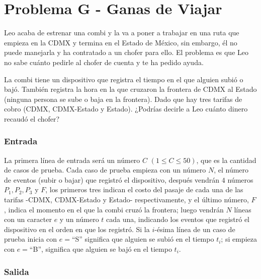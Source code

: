 \chapter*{Problema G - Ganas de Viajar}


Leo acaba de estrenar una combi y la va a poner a trabajar en una ruta que empieza en la CDMX y termina en el Estado de México, sin embargo, él no puede manejarla y ha contratado a un chofer para ello. El problema es que Leo no sabe cuánto pedirle al chofer de cuenta y te ha pedido ayuda.

La combi tiene un dispositivo que registra el tiempo en el que alguien subió o bajó. También registra la hora en la que cruzaron la frontera de CDMX al Estado (ninguna persona se sube o baja en la frontera). Dado que hay tres tarifas de cobro (CDMX, CDMX-Estado y Estado). ¿Podrías decirle a Leo cuánto dinero recaudó el chofer?


\subsection*{Entrada}

La primera línea de entrada será un número $C$ $(1 \leq  C\leq 50)$, que es la cantidad de casos de prueba. Cada caso de prueba empieza con un número $N$, el número de eventos (subir o bajar) que registró el dispositivo, después vendrán $4$ números $P_1, P_2, P_3$ y $F$, los primeros tres  indican el costo del pasaje de cada una de las tarifas -CDMX, CDMX-Estado y Estado- respectivamente, y el último número, $F$, indica el momento en el que la combi cruzó la frontera; luego vendrán $N$ líneas con un caracter $e$ y un número $t$ cada una, indicando los eventos que registró el dispositivo en el orden en que los registró. Si la $i$-ésima línea de un caso de prueba inicia con $e=$``S'' significa que alguien se subió en el tiempo $t_i$; si empieza con $e=$``B'', significa que alguien se bajó en el tiempo $t_i$. 


\subsection*{Salida}

